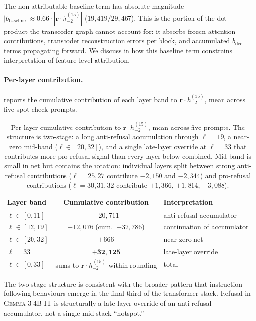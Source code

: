 \documentclass{article}
\newcommand{\rvec}{\bm{r}}
\newcommand{\gemma}{\textsc{Gemma-3-4B-IT}}
\begin{document}
The non-attributable baseline term has absolute magnitude
$|b_{\mathrm{baseline}}| \approx 0.66 \cdot |\rvec \cdot h_{-2}^{(15)}|$
($19{,}419 / 29{,}467$). This is the portion of the dot product the
transcoder graph cannot account for: it absorbs frozen attention
contributions, transcoder reconstruction errors per block, and
accumulated $b_{\mathrm{dec}}$ terms propagating forward. We discuss
in  how this baseline term constrains
interpretation of feature-level attribution.

\paragraph{Per-layer contribution.}  reports the
cumulative contribution of each layer band to
$\rvec \cdot h_{-2}^{(15)}$, mean across five spot-check prompts.

\begin{table}[h]
\centering
\small
\begin{tabular}{lcl}
\toprule
Layer band & Cumulative contribution & Interpretation \\
\midrule
$\ell \in [0, 11]$  & $-20{,}711$ & anti-refusal accumulator \\
$\ell \in [12, 19]$ & $-12{,}076$ (cum.\ $-32{,}786$) & continuation of accumulator \\
$\ell \in [20, 32]$ & $+666$ & near-zero net \\
$\ell = 33$         & $\mathbf{+32{,}125}$ & late-layer override \\
\midrule
$\ell \in [0, 33]$  & sums to $\rvec \cdot h_{-2}^{(15)}$ within rounding & total \\
\bottomrule
\end{tabular}
\caption{Per-layer cumulative contribution to
$\rvec \cdot h_{-2}^{(15)}$, mean across five prompts. The
structure is two-stage: a long anti-refusal accumulation through
$\ell = 19$, a near-zero mid-band ($\ell \in [20, 32]$), and a
single late-layer override at $\ell = 33$ that contributes more
pro-refusal signal than every layer below combined. Mid-band is
small in net but contains the rotation: individual layers split
between strong anti-refusal contributions
($\ell = 25, 27$ contribute $-2{,}150$ and $-2{,}344$) and
pro-refusal contributions ($\ell = 30, 31, 32$ contribute
$+1{,}366$, $+1{,}814$, $+3{,}088$).}
\label{tab:per-layer}
\end{table}

The two-stage structure is consistent with the broader pattern that
instruction-following behaviours emerge in the final third of the
transformer stack. Refusal in \gemma{} is structurally a late-layer
override of an anti-refusal accumulator, not a single mid-stack
``hotspot.''
\end{document}
